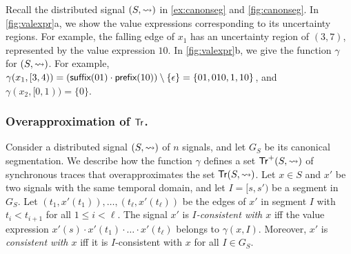 \begin{example} \label{ex:valexpr}
	Recall the distributed signal $(S, {\rightsquigarrow})$ in \cref{ex:canonseg} and \cref{fig:canonseg}.
	In \cref{fig:valexpr}a, we show the value expressions corresponding to its uncertainty regions.
	For example, the falling edge of $x_1$ has an uncertainty region of $(3,7)$, represented by the value expression $10$.
	In \cref{fig:valexpr}b, we give the function $\gamma$ for $(S, {\rightsquigarrow})$.
	For example, $\gamma(x_1, [3,4)) = (\textsf{suffix}(01) \cdot \textsf{prefix}(10)) \setminus \{\epsilon\} = \{ 01, 010, 1, 10\}$, and 
	$\gamma(x_2, [0,1)) = \{0\}$.
\end{example}




\subsubsection{Overapproximation of $\mathsf{Tr}$.}
Consider a distributed signal $(S,{\rightsquigarrow})$ of $n$ signals, and let $G_S$ be its canonical segmentation.
We describe how the function $\gamma$ defines a set $\mathsf{Tr}^+(S,{\rightsquigarrow})$ of synchronous traces that overapproximates the set $\mathsf{Tr}(S,{\rightsquigarrow})$.
%
%
%
Let $x \in S$ and $x'$ be two signals with the same temporal domain, and let $I = [s, s')$ be a segment in $G_S$.
Let $(t_1, x'(t_1)), \ldots, (t_\ell, x'(t_\ell))$ be the edges of $x'$ in segment $I$ with $t_i < t_{i+1}$ for all $1 \leq i < \ell$.
The signal $x'$ is \emph{$I$-consistent with $x$} iff the value expression $x'(s) \cdot x'(t_1) \cdot \ldots \cdot x'(t_\ell)$ belongs to $\gamma(x,I)$.
Moreover, $x'$ is \emph{consistent with $x$} iff it is $I$-consistent with $x$ for all $I \in G_S$.

